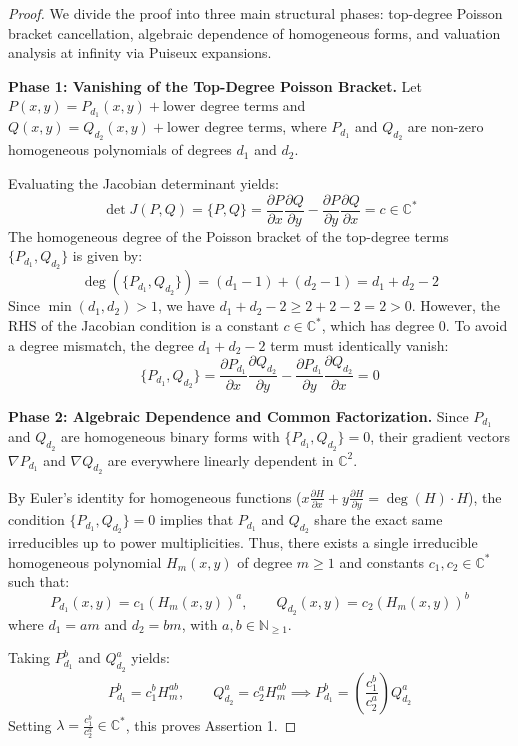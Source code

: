 \documentclass[11pt,reqno]{amsart}
\theoremstyle{definition}
\begin{document}
\begin{proof}
We divide the proof into three main structural phases: top-degree Poisson bracket cancellation, algebraic dependence of homogeneous forms, and valuation analysis at infinity via Puiseux expansions.

\textbf{Phase 1: Vanishing of the Top-Degree Poisson Bracket.}
Let $P(x,y) = P_{d_1}(x,y) + \text{lower degree terms}$ and $Q(x,y) = Q_{d_2}(x,y) + \text{lower degree terms}$, where $P_{d_1}$ and $Q_{d_2}$ are non-zero homogeneous polynomials of degrees $d_1$ and $d_2$. 

Evaluating the Jacobian determinant yields:
$$\det J(P,Q) = \{P, Q\} = \frac{\partial P}{\partial x}\frac{\partial Q}{\partial y} - \frac{\partial P}{\partial y}\frac{\partial Q}{\partial x} = c \in \mathbb{C}^*$$
The homogeneous degree of the Poisson bracket of the top-degree terms $\{P_{d_1}, Q_{d_2}\}$ is given by:
$$\deg(\{P_{d_1}, Q_{d_2}\}) = (d_1 - 1) + (d_2 - 1) = d_1 + d_2 - 2$$
Since $\min(d_1, d_2) > 1$, we have $d_1 + d_2 - 2 \ge 2 + 2 - 2 = 2 > 0$. However, the RHS of the Jacobian condition is a constant $c \in \mathbb{C}^*$, which has degree $0$. To avoid a degree mismatch, the degree $d_1 + d_2 - 2$ term must identically vanish:
$$\{P_{d_1}, Q_{d_2}\} = \frac{\partial P_{d_1}}{\partial x}\frac{\partial Q_{d_2}}{\partial y} - \frac{\partial P_{d_1}}{\partial y}\frac{\partial Q_{d_2}}{\partial x} = 0$$

\textbf{Phase 2: Algebraic Dependence and Common Factorization.}
Since $P_{d_1}$ and $Q_{d_2}$ are homogeneous binary forms with $\{P_{d_1}, Q_{d_2}\} = 0$, their gradient vectors $\nabla P_{d_1}$ and $\nabla Q_{d_2}$ are everywhere linearly dependent in $\mathbb{C}^2$. 

By Euler's identity for homogeneous functions ($x \frac{\partial H}{\partial x} + y \frac{\partial H}{\partial y} = \deg(H) \cdot H$), the condition $\{P_{d_1}, Q_{d_2}\} = 0$ implies that $P_{d_1}$ and $Q_{d_2}$ share the exact same irreducibles up to power multiplicities. Thus, there exists a single irreducible homogeneous polynomial $H_m(x,y)$ of degree $m \ge 1$ and constants $c_1, c_2 \in \mathbb{C}^*$ such that:
$$P_{d_1}(x,y) = c_1 \left(H_m(x,y)\right)^a, \qquad Q_{d_2}(x,y) = c_2 \left(H_m(x,y)\right)^b$$
where $d_1 = a m$ and $d_2 = b m$, with $a, b \in \mathbb{N}_{\ge 1}$.

Taking $P_{d_1}^b$ and $Q_{d_2}^a$ yields:
$$P_{d_1}^b = c_1^b H_m^{ab}, \qquad Q_{d_2}^a = c_2^a H_m^{ab} \implies P_{d_1}^b = \left(\frac{c_1^b}{c_2^a}\right) Q_{d_2}^a$$
Setting $\lambda = \frac{c_1^b}{c_2^a} \in \mathbb{C}^*$, this proves Assertion 1.


\end{proof}
\end{document}
